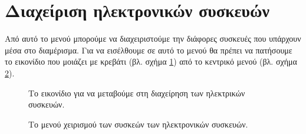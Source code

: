 \documentclass[a4paper,titlepage,twoside,12pt,leqno]{article}
\begin{document}
\newpage

\section{Διαχείριση ηλεκτρονικών συσκευών}
\label{syskeuves}

Από αυτό το μενού μπορούμε να διαχειριστούμε την διάφορες συσκευές που υπάρχουν μέσα στο διαμέρισμα. Για να εισέλθουμε σε αυτό το μενού θα πρέπει να πατήσουμε το εικονίδιο που μοιάζει με κρεβάτι (βλ. σχήμα \ref{fig:icon:room}) από το κεντρικό μενού (βλ. σχήμα \ref{fig:menu:room}).

\begin{figure}
\begin{center}
\caption{Το εικονίδιο για να μεταβούμε στη διαχείρηση των ηλεκτρικών συσκευών.}
\label{fig:icon:room}
\end{center}
\end{figure}

\begin{figure}
\begin{center}
\caption{Το μενού χειρισμού των συσκεών των ηλεκτρονικών συσκευών.}
\label{fig:menu:room}
\end{center}
\end{figure}
\end{document}
